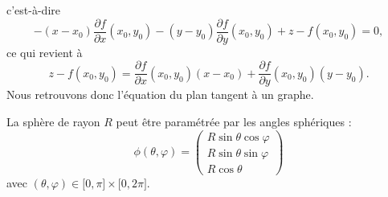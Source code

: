 c'est-à-dire
\begin{equation}
	-(x-x_0)\frac{ \partial f }{ \partial x }(x_0,y_0)-(y-y_0)\frac{ \partial f }{ \partial y }(x_0,y_0)+z-f(x_0,y_0)=0,
\end{equation}
ce qui revient à
\begin{equation}
	z-f(x_0,y_0)=\frac{ \partial f }{ \partial x }(x_0,y_0)(x-x_0)+\frac{ \partial f }{ \partial y }(x_0,y_0)(y-y_0).
\end{equation}
Nous retrouvons donc l'équation du plan tangent à un graphe.

\begin{example}
	La sphère de rayon \( R\) peut être paramétrée par les angles sphériques :
	\begin{equation}
		\phi(\theta,\varphi)=\begin{pmatrix}
			R\sin\theta\cos\varphi \\
			R\sin\theta\sin\varphi \\
			R\cos\theta
		\end{pmatrix}
	\end{equation}
	avec \( (\theta,\varphi)\in\mathopen[ 0 , \pi \mathclose]\times \mathopen[ 0 , 2\pi \mathclose]\).


\end{example}
